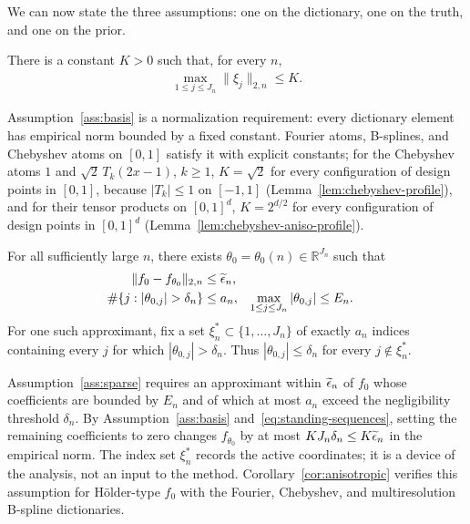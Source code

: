 We can now state the three assumptions: one on the dictionary, one on the truth, and one on the prior.

\begin{assumption}[Basis]\label{ass:basis}
There is a constant $K > 0$ such that, for every $n$,
\begin{align}
\max_{1\leq j\leq J_n}\|\xi_j\|_{2,n}\leq K. \label{basis}
\end{align}
\end{assumption}

Assumption~\ref{ass:basis} is a normalization requirement: every dictionary element has empirical norm bounded by a fixed constant. Fourier atoms, B-splines, and Chebyshev atoms on $[0,1]$ satisfy it with explicit constants; for the Chebyshev atoms $1$ and $\sqrt2\,T_k(2x-1)$, $k\geq1$, $K=\sqrt2$ for every configuration of design points in $[0,1]$, because $|T_k|\leq1$ on $[-1,1]$ (Lemma~\ref{lem:chebyshev-profile}), and for their tensor products on $[0,1]^d$, $K=2^{d/2}$ for every configuration of design points in $[0,1]^d$ (Lemma~\ref{lem:chebyshev-aniso-profile}).

\begin{assumption}\label{ass:sparse}
For all sufficiently large $n$, there exists $\theta_0=\theta_0(n)\in\mathbb{R}^{J_n}$ such that
\begin{align}
\|f_0-f_{\theta_0}\|_{2,n}&\leq\en, \label{approx}\\
\#\{j:|\theta_{0,j}|>\delta_n\}&\leq a_n,
&\max_{1\leq j\leq J_n}|\theta_{0,j}|&\leq E_n. \label{eq:sparse-approximant}
\end{align}
For one such approximant, fix a set $\xi_n^*\subset\{1,\ldots,J_n\}$ of exactly $a_n$ indices containing every $j$ for which $|\theta_{0,j}|>\delta_n$. Thus $|\theta_{0,j}|\leq\delta_n$ for every $j\notin\xi_n^*$.
\end{assumption}

Assumption~\ref{ass:sparse} requires an approximant within $\widetilde{\epsilon}_n$ of $f_0$ whose coefficients are bounded by $E_n$ and of which at most $a_n$ exceed the negligibility threshold $\delta_n$. By Assumption~\ref{ass:basis} and~\eqref{eq:standing-sequences}, setting the remaining coefficients to zero changes $f_{\theta_0}$ by at most $KJ_n\delta_n\leq K\widetilde{\epsilon}_n$ in the empirical norm. The index set $\xi_n^*$ records the active coordinates; it is a device of the analysis, not an input to the method. Corollary~\ref{cor:anisotropic} verifies this assumption for H\"older-type $f_0$ with the Fourier, Chebyshev, and multiresolution B-spline dictionaries.

